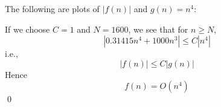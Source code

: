 The following are plots of $|f(n)|$ and $g(n) = n^4$:


If we choose $C = 1$ and $N = 1600$,
we see that for $n \geq N$,
\[
\left|
0.31415 n^{4} + 1000n^3 
\right| 
\leq C
\left|
n^4
\right|
\]
i.e.,
\[
|f(n)| \leq C|g(n)|
\]
Hence
\[
f(n) = O(n^4)
\]
\qed
